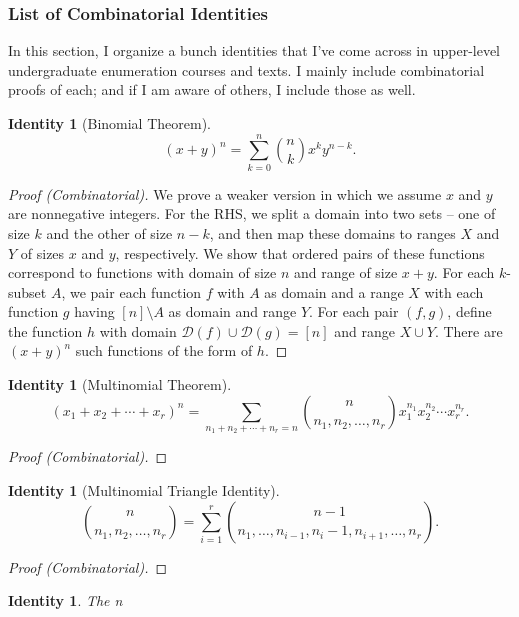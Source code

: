 \documentclass[12]{article}
\newcounter{identityCounter}
\newtheorem{iden}[identityCounter]{Identity}
\theoremstyle{definition}
\begin{document}
	\subsubsection{List of Combinatorial Identities}
	In this section, I organize a bunch identities that I've come across in upper-level undergraduate enumeration courses and texts.  I mainly include combinatorial proofs of each; and if I am aware of others, I include those as well.
	
	\begin{iden}[Binomial Theorem]
		$$(x+y)^n = \sum_{k=0}^n {n \choose k} x^k y^{n-k}.$$
	\end{iden}
	\begin{proof}[Proof (Combinatorial)]
		We prove a weaker version in which we assume $x$ and $y$ are nonnegative integers.  For the RHS, we split a domain into two sets -- one of size $k$ and the other of size $n-k$, and then map these domains to ranges $X$ and $Y$ of sizes $x$ and $y$, respectively.  We show that ordered pairs of these functions correspond to functions with domain of size $n$ and range of size $x+y$.  For each $k$-subset $A$, we pair each function $f$ with $A$ as domain and a range $X$ with each function $g$ having $[n] \setminus A$ as domain and range $Y$.  For each pair $(f,g)$, define the function $h$ with domain $\mathcal{D}(f) \cup \mathcal{D}(g) = [n]$ and range $X \cup Y$.  There are $(x+y)^n$ such functions of the form of $h$.
	\end{proof}

	\begin{iden}[Multinomial Theorem]
		$$(x_1 + x_2 + \cdots + x_r)^n = \sum_{n_1 + n_2 + \cdots + n_r = n} {n \choose n_1, n_2, \ldots, n_r}x_1^{n_1}x_2^{n_2}\cdots x_r^{n_r}.$$
	\end{iden}
	\begin{proof}[Proof (Combinatorial)]
		
	\end{proof}

	\begin{iden}[Multinomial Triangle Identity]
		$${n \choose n_1, n_2, \ldots, n_r} = \sum_{i=1}^r {n-1 \choose n_1, \ldots, n_{i-1}, n_i-1, n_{i+1}, \ldots, n_r}.$$
	\end{iden}
	\begin{proof}[Proof (Combinatorial)]
		
	\end{proof}

	\begin{iden}
		The n
	\end{iden}
	
\end{document}
